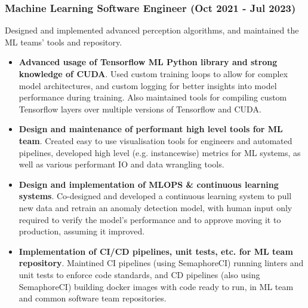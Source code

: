 \documentclass[12pt]{article}
\begin{document}
\begin{FlushLeft}
  \subsubsection{Machine Learning Software Engineer (Oct 2021 - Jul 2023)}
  Designed and implemented advanced perception algorithms, and maintained the ML teams' tools and repository. \\

  \begin{itemize}
  \item \textbf{Advanced usage of Tensorflow ML Python library and strong knowledge of CUDA}. Used custom training loops to allow for complex model architectures, and custom logging for better insights into model performance during training. Also maintained tools for compiling custom Tensorflow layers over multiple versions of Tensorflow and CUDA. \\
  \item \textbf{Design and maintenance of performant high level tools for ML team}. Created easy to use visualisation tools for engineers and automated pipelines, developed high level (e.g. instancewise) metrics for ML systems, as well as various performant IO and data wrangling tools. \\
  \item \textbf{Design and implementation of MLOPS \& continuous learning systems}. Co-designed and developed a continuous learning system to pull new data and retrain an anomaly detection model, with human input only required to verify the model's performance and to approve moving it to production, assuming it improved.
  \item \textbf{Implementation of CI/CD pipelines, unit tests, etc. for ML team repository}. Maintined CI pipelines (using SemaphoreCI) running linters and unit tests to enforce code standards, and CD pipelines (also using SemaphoreCI) building docker images with code ready to run, in ML team and common software team repositories.
  \end{itemize}


\end{FlushLeft}
\end{document}

